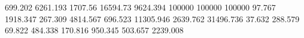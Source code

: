 699.202    6261.193   %
1707.56    16594.73   %
9624.394   100000     %
100000     100000     %
97.767     1918.347   %
267.309    4814.567   %
696.523    11305.946  %
2639.762   31496.736  %
37.632     288.579    %
69.822     484.338    %
170.816    950.345    %
503.657    2239.008   %

